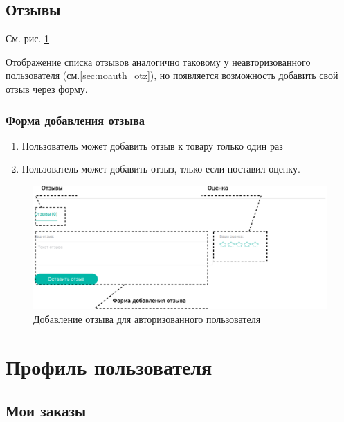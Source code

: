         \subsection{Отзывы}

            См. рис. \ref{fig:auth_goods_cart_otz}

            Отображение списка отзывов аналогично таковому у неавторизованного
            пользователя (см.\ref{sec:noauth_otz}), но появляется возможность 
            добавить свой отзыв через форму.

            \subsubsection{Форма добавления отзыва}
                
                \begin{enumerate}
                    \item Пользователь может добавить отзыв к товару только 
                    один раз
                    \item Пользователь может добавить отзыз, тлько если 
                    поставил оценку.
                \end{enumerate}

           \begin{figure}
                \center
                \includegraphics[width=170mm]{04_auth_funcs/figures/06.eps}
                \caption{Добавление отзыва для авторизованного пользователя}
                \label{fig:auth_goods_cart_otz}
            \end{figure}

               
     \section{Профиль пользователя}

        \subsection{Мои заказы}\label{sec:auth_my_orders}

